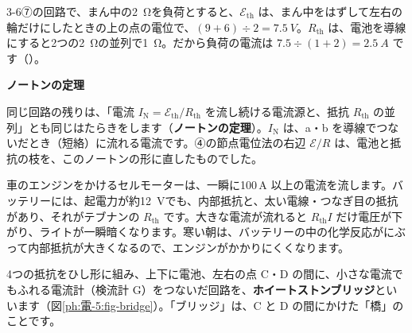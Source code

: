 3-6⑦の回路で、まん中の\qty{2}{\ohm}を負荷とすると、$\mathcal E_{\mathrm{th}}$ は、まん中をはずして左右の輪だけにしたときの上の点の電位で、$(9+6)\div2=\qty{7.5}{V}$。$R_{\mathrm{th}}$ は、電池を導線にすると2つの\qty{2}{\ohm}の並列で\qty{1}{\ohm}。だから負荷の電流は $7.5\div(1+2)=\qty{2.5}{A}$ です（）。

\begin{phflow}
\end{phflow}

\noindent\textbf{ノートンの定理}\par\nobreak
同じ回路の残りは、「電流 $I_{\mathrm N}=\mathcal E_{\mathrm{th}}/R_{\mathrm{th}}$ を流し続ける電流源と、抵抗 $R_{\mathrm{th}}$ の並列」とも同じはたらきをします（\textbf{ノートンの定理}）。$I_{\mathrm N}$ は、a・b を導線でつないだとき（短絡）に流れる電流です。④の節点電位法の右辺 $\mathcal E/R$ は、電池と抵抗の枝を、このノートンの形に直したものでした。

\begin{phmijika}
車のエンジンをかけるセルモーターは、一瞬に100\,A 以上の電流を流します。バッテリーには、起電力が約\qty{12}{V}でも、内部抵抗と、太い電線・つなぎ目の抵抗があり、それがテブナンの $R_{\mathrm{th}}$ です。大きな電流が流れると $R_{\mathrm{th}}I$ だけ電圧が下がり、ライトが一瞬暗くなります。寒い朝は、バッテリーの中の化学反応がにぶって内部抵抗が大きくなるので、エンジンがかかりにくくなります。
\end{phmijika}


\leavevmode\label{ph:電-5:sec7}4つの抵抗をひし形に組み、上下に電池、左右の点 C・D の間に、小さな電流でもふれる電流計（検流計 G）をつないだ回路を、\textbf{ホイートストンブリッジ}といいます（図\ref{ph:電-5:fig-bridge}）。「ブリッジ」は、C と D の間にかけた「橋」のことです。

